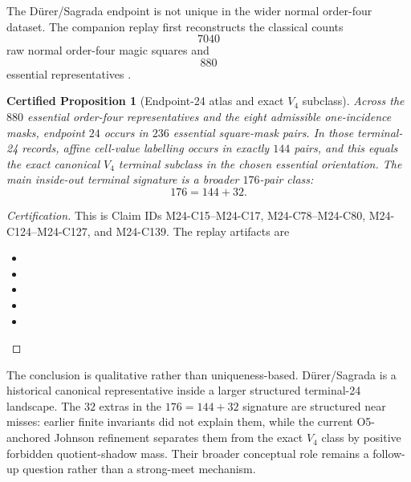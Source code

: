 \documentclass[11pt,a4paper]{article}
\newtheorem{certprop}[theorem]{Certified Proposition}
\theoremstyle{definition}
\theoremstyle{remark}
\newcommand{\Durer}{D\"urer\xspace}
\begin{document}
The \Durer/Sagrada endpoint is not unique in the wider normal order-four
dataset.  The companion replay first reconstructs the classical counts
\[
7040
\]
raw normal order-four magic squares and
\[
880
\]
essential representatives \cite{ollerenshawBondi}.

\begin{certprop}[Endpoint-24 atlas and exact \(V_4\) subclass]
\label{prop:order4-extension}
Across the \(880\) essential order-four representatives and the eight
admissible one-incidence masks, endpoint \(24\) occurs in \(236\)
essential square-mask pairs.  In those terminal-24 records, affine cell-value
labelling occurs in exactly \(144\) pairs, and this equals the exact
canonical \(V_4\) terminal subclass in the chosen essential orientation.  The
main inside-out terminal signature is a broader \(176\)-pair class:
\[
176=144+32.
\]
\end{certprop}

\begin{proof}[Certification]
This is Claim IDs M24-C15--M24-C17, M24-C78--M24-C80, M24-C124--M24-C127,
and M24-C139.  The replay artifacts are
\begin{itemize}[leftmargin=*]
\item {}
\item {}
\item {}
\item {}
\item {}
\end{itemize}
\end{proof}

The conclusion is qualitative rather than uniqueness-based.  \Durer/Sagrada is
a historical canonical representative inside a larger structured terminal-24
landscape.  The \(32\) extras in the \(176=144+32\) signature are structured
near misses: earlier finite invariants did not explain them, while the
current O5-anchored Johnson refinement separates them from the exact
\(V_4\) class by positive forbidden quotient-shadow mass.  Their broader
conceptual role remains a follow-up question rather than a strong-meet
mechanism.
\end{document}
